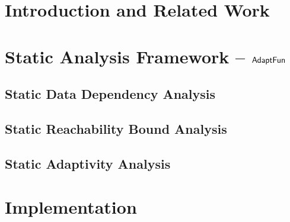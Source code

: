 
\section{Introduction and Related Work}
\label{sec:static-intro}


\section{Static Analysis Framework -- $\textsf{AdaptFun}$}
\label{sec:static-adapfun}


\subsection{Static Data Dependency Analysis}
\label{subsec:static-datadep}


\subsection{Static Reachability Bound Analysis}
\label{subsec:static-reachability}


\subsection{Static Adaptivity Analysis}
\label{subsec:static-adapt}


%
\section{Implementation}
\label{sec:static-implementation}

